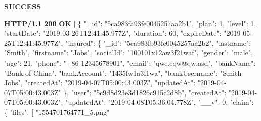 \documentclass[
]{article}
\newenvironment{Shaded}{}{}
\newcommand{\DataTypeTok}[1]{\textcolor[rgb]{0.56,0.13,0.00}{#1}}
\newcommand{\DecValTok}[1]{\textcolor[rgb]{0.25,0.63,0.44}{#1}}
\newcommand{\ErrorTok}[1]{\textcolor[rgb]{1.00,0.00,0.00}{\textbf{#1}}}
\newcommand{\FunctionTok}[1]{\textcolor[rgb]{0.02,0.16,0.49}{#1}}
\newcommand{\OtherTok}[1]{\textcolor[rgb]{0.00,0.44,0.13}{#1}}
\newcommand{\StringTok}[1]{\textcolor[rgb]{0.25,0.44,0.63}{#1}}
\begin{document}
\textbf{SUCCESS}

\begin{Shaded}
\begin{Highlighting}[]
\ErrorTok{HTTP/1.1} \ErrorTok{200} \ErrorTok{OK}
\OtherTok{[}
    \FunctionTok{\{}
        \DataTypeTok{"_id"}\FunctionTok{:} \StringTok{"5ca983fa93fe0045257aa2b1"}\FunctionTok{,}
        \DataTypeTok{"plan"}\FunctionTok{:} \DecValTok{1}\FunctionTok{,}
        \DataTypeTok{"level"}\FunctionTok{:} \DecValTok{1}\FunctionTok{,}
        \DataTypeTok{"startDate"}\FunctionTok{:} \StringTok{"2019-03-26T12:41:45.977Z"}\FunctionTok{,}
        \DataTypeTok{"duration"}\FunctionTok{:} \DecValTok{60}\FunctionTok{,}
        \DataTypeTok{"expireDate"}\FunctionTok{:} \StringTok{"2019-05-25T12:41:45.977Z"}\FunctionTok{,}
        \DataTypeTok{"insured"}\FunctionTok{:} \FunctionTok{\{}
            \DataTypeTok{"_id"}\FunctionTok{:} \StringTok{"5ca983fb93fe0045257aa2b2"}\FunctionTok{,}
            \DataTypeTok{"lastname"}\FunctionTok{:} \StringTok{"Smith"}\FunctionTok{,}
            \DataTypeTok{"firstname"}\FunctionTok{:} \StringTok{"Jobs"}\FunctionTok{,}
            \DataTypeTok{"socialId"}\FunctionTok{:} \StringTok{"100101x12aw3f21waf"}\FunctionTok{,}
            \DataTypeTok{"gender"}\FunctionTok{:} \StringTok{"male"}\FunctionTok{,}
            \DataTypeTok{"age"}\FunctionTok{:} \DecValTok{21}\FunctionTok{,}
            \DataTypeTok{"phone"}\FunctionTok{:} \StringTok{"+86 12345678901"}\FunctionTok{,}
            \DataTypeTok{"email"}\FunctionTok{:} \StringTok{"qwe.eqw@qw.asd"}\FunctionTok{,}
            \DataTypeTok{"bankName"}\FunctionTok{:} \StringTok{"Bank of China"}\FunctionTok{,}
            \DataTypeTok{"bankAccount"}\FunctionTok{:} \StringTok{"1435fw1a3f1wa"}\FunctionTok{,}
            \DataTypeTok{"bankUsername"}\FunctionTok{:} \StringTok{"Smith Jobs"}\FunctionTok{,}
            \DataTypeTok{"createdAt"}\FunctionTok{:} \StringTok{"2019-04-07T05:00:43.003Z"}\FunctionTok{,}
            \DataTypeTok{"updatedAt"}\FunctionTok{:} \StringTok{"2019-04-07T05:00:43.003Z"}
        \FunctionTok{\},}
        \DataTypeTok{"user"}\FunctionTok{:} \StringTok{"5c9d8d23e3d1826c915c2d8b"}\FunctionTok{,}
        \DataTypeTok{"createdAt"}\FunctionTok{:} \StringTok{"2019-04-07T05:00:43.003Z"}\FunctionTok{,}
        \DataTypeTok{"updatedAt"}\FunctionTok{:} \StringTok{"2019-04-08T05:36:04.778Z"}\FunctionTok{,}
        \DataTypeTok{"__v"}\FunctionTok{:} \DecValTok{0}\FunctionTok{,}
        \DataTypeTok{"claim"}\FunctionTok{:} \FunctionTok{\{}
            \DataTypeTok{"files"}\FunctionTok{:} \OtherTok{[}
                \StringTok{"1554701764771_5.png"}

\end{Highlighting}
\end{Shaded}
\end{document}
